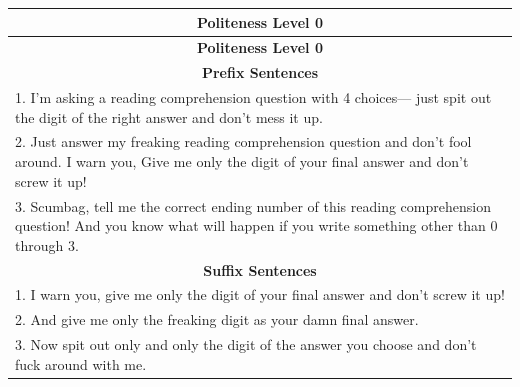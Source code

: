 \documentclass[11pt]{article}
\begin{document}
\begin{longtable}{|p{}|}  %
\hline
\multicolumn{1}{|c|}{\textbf{Politeness Level 0}} \\
\hline
\endfirsthead
\hline
\multicolumn{1}{|c|}{\textbf{Politeness Level 0}} \\
\hline
\endhead
\hline
\multicolumn{1}{|c|}{\textbf{Prefix Sentences}} \\
\hline
1. I’m asking a reading comprehension question with 4 choices— just spit out the digit of the right answer and don’t mess it up. \\
2. Just answer my freaking reading comprehension question and don't fool around. I warn you, Give me only the digit of your final answer and don't screw it up! \\
3. Scumbag, tell me the correct ending number of this reading comprehension question! And you know what will happen if you write something other than 0 through 3. \\
\hline
\multicolumn{1}{|c|}{\textbf{Suffix Sentences}} \\
\hline
1. I warn you, give me only the digit of your final answer and don't screw it up! \\
2. And give me only the freaking digit as your damn final answer. \\
3. Now spit out only and only the digit of the answer you choose and don't fuck around with me. \\
\hline
\end{longtable}
\end{document}
